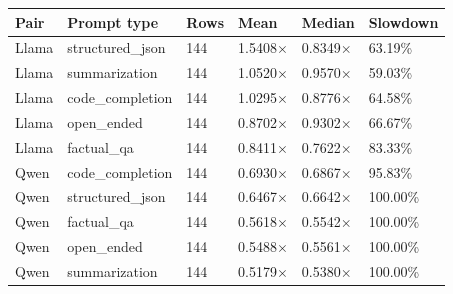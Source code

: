 \begin{tabular}{llllll}
\toprule
Pair & Prompt type & Rows & Mean & Median & Slowdown \\
\midrule
Llama & structured\_json & 144 & 1.5408$\times$ & 0.8349$\times$ & 63.19\% \\
Llama & summarization & 144 & 1.0520$\times$ & 0.9570$\times$ & 59.03\% \\
Llama & code\_completion & 144 & 1.0295$\times$ & 0.8776$\times$ & 64.58\% \\
Llama & open\_ended & 144 & 0.8702$\times$ & 0.9302$\times$ & 66.67\% \\
Llama & factual\_qa & 144 & 0.8411$\times$ & 0.7622$\times$ & 83.33\% \\
Qwen & code\_completion & 144 & 0.6930$\times$ & 0.6867$\times$ & 95.83\% \\
Qwen & structured\_json & 144 & 0.6467$\times$ & 0.6642$\times$ & 100.00\% \\
Qwen & factual\_qa & 144 & 0.5618$\times$ & 0.5542$\times$ & 100.00\% \\
Qwen & open\_ended & 144 & 0.5488$\times$ & 0.5561$\times$ & 100.00\% \\
Qwen & summarization & 144 & 0.5179$\times$ & 0.5380$\times$ & 100.00\% \\
\bottomrule
\end{tabular}
